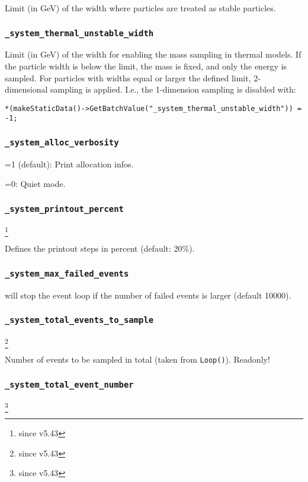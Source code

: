 {Limit (in GeV) of the width where particles are treated as stable particles.

\subsubsection{\texttt{\_system\_thermal\_unstable\_width}}

Limit (in GeV) of the width for enabling the mass sampling in thermal
models. If the particle width is below the limit, the mass is fixed,
and only the energy is sampled. For particles with widths equal or larger the
defined limit, 2-dimensional sampling is applied. I.e., the
1-dimension sampling is disabled with:

\begin{verbatim}
*(makeStaticData()->GetBatchValue("_system_thermal_unstable_width")) = -1;
\end{verbatim}

\subsubsection{\texttt{\_system\_alloc\_verbosity}}

=1 (default): Print allocation infos.

=0: Quiet mode.

\subsubsection{\texttt{\_system\_printout\_percent}}\footnote{since v5.43}

Defines the printout steps in percent (default: 20\%).

\subsubsection{\texttt{\_system\_max\_failed\_events}}

 will stop the event loop if the number of failed events is larger (default 10000).

\subsubsection{\texttt{\_system\_total\_events\_to\_sample}}\footnote{since v5.43}

Number of events to be sampled in total (taken from \texttt{Loop()}). Readonly!

\subsubsection{\texttt{\_system\_total\_event\_number}}\footnote{since v5.43}

}

